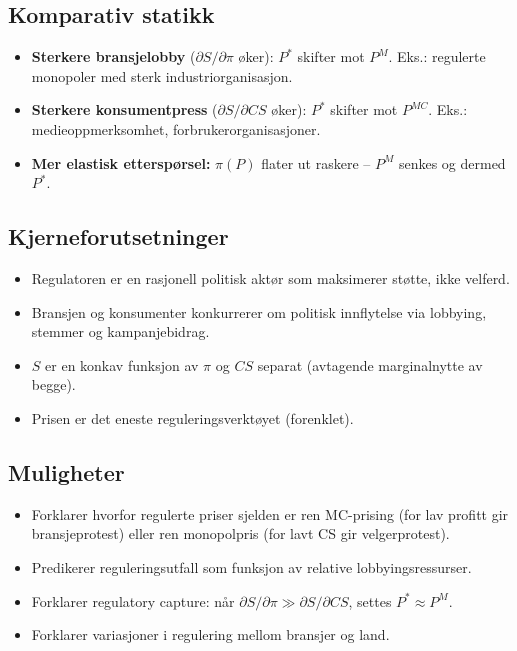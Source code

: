 \subsection*{Komparativ statikk}
\begin{itemize}\setlength{\itemsep}{2pt}
\item \textbf{Sterkere bransjelobby} ($\partial S/\partial \pi$ øker): $P^{*}$ skifter mot $P^M$. Eks.: regulerte monopoler med sterk industriorganisasjon.
\item \textbf{Sterkere konsumentpress} ($\partial S/\partial CS$ øker): $P^{*}$ skifter mot $P^{MC}$. Eks.: medieoppmerksomhet, forbrukerorganisasjoner.
\item \textbf{Mer elastisk etterspørsel:} $\pi(P)$ flater ut raskere -- $P^M$ senkes og dermed $P^{*}$.
\end{itemize}

\subsection*{Kjerneforutsetninger}
\begin{itemize}
\item Regulatoren er en rasjonell politisk aktør som maksimerer støtte, ikke velferd.
\item Bransjen og konsumenter konkurrerer om politisk innflytelse via lobbying, stemmer og kampanjebidrag.
\item $S$ er en konkav funksjon av $\pi$ og $CS$ separat (avtagende marginalnytte av begge).
\item Prisen er det eneste reguleringsverktøyet (forenklet).
\end{itemize}

\subsection*{Muligheter}
\begin{itemize}
\item Forklarer hvorfor regulerte priser sjelden er ren MC-prising (for lav profitt gir bransjeprotest) eller ren monopolpris (for lavt CS gir velgerprotest).
\item Predikerer reguleringsutfall som funksjon av relative lobbyingsressurser.
\item Forklarer regulatory capture: når $\partial S/\partial \pi \gg \partial S/\partial CS$, settes $P^{*}\approx P^M$.
\item Forklarer variasjoner i regulering mellom bransjer og land.
\end{itemize}

